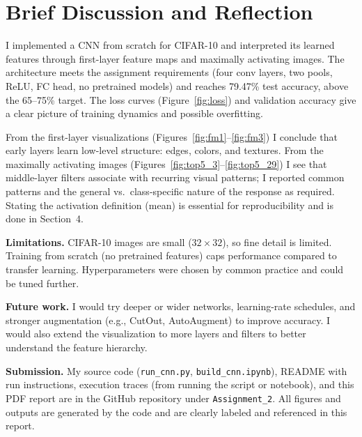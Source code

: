 \documentclass[11pt]{article}
\begin{document}
\section{Brief Discussion and Reflection}

I implemented a CNN from scratch for CIFAR-10 and interpreted its learned features through first-layer feature maps and maximally activating images. The architecture meets the assignment requirements (four conv layers, two pools, ReLU, FC head, no pretrained models) and reaches 79.47\% test accuracy, above the 65--75\% target. The loss curves (Figure~\ref{fig:loss}) and validation accuracy give a clear picture of training dynamics and possible overfitting.

From the first-layer visualizations (Figures~\ref{fig:fm1}--\ref{fig:fm3}) I conclude that early layers learn low-level structure: edges, colors, and textures. From the maximally activating images (Figures~\ref{fig:top5_3}--\ref{fig:top5_29}) I see that middle-layer filters associate with recurring visual patterns; I reported common patterns and the general vs.\ class-specific nature of the response as required. Stating the activation definition (mean) is essential for reproducibility and is done in Section~4.

\textbf{Limitations.} CIFAR-10 images are small ($32\times32$), so fine detail is limited. Training from scratch (no pretrained features) caps performance compared to transfer learning. Hyperparameters were chosen by common practice and could be tuned further.

\textbf{Future work.} I would try deeper or wider networks, learning-rate schedules, and stronger augmentation (e.g., CutOut, AutoAugment) to improve accuracy. I would also extend the visualization to more layers and filters to better understand the feature hierarchy.

\textbf{Submission.} My source code (\texttt{run\_cnn.py}, \texttt{build\_cnn.ipynb}), README with run instructions, execution traces (from running the script or notebook), and this PDF report are in the GitHub repository under \texttt{Assignment\_2}. All figures and outputs are generated by the code and are clearly labeled and referenced in this report.
\end{document}
